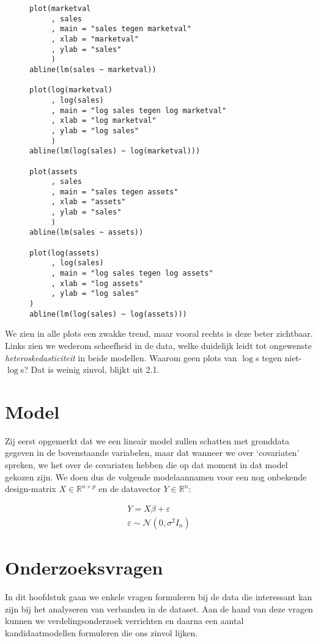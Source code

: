 \documentclass[a4paper, notitlepage]{report}
\begin{document}
\begin{figure}
\begin{verbatim}
plot(marketval
     , sales
     , main = "sales tegen marketval"
     , xlab = "marketval"
     , ylab = "sales"
     )
abline(lm(sales ~ marketval))

plot(log(marketval)
     , log(sales)
     , main = "log sales tegen log marketval"
     , xlab = "log marketval"
     , ylab = "log sales"
     )
abline(lm(log(sales) ~ log(marketval)))

plot(assets
     , sales
     , main = "sales tegen assets"
     , xlab = "assets"
     , ylab = "sales"
     )
abline(lm(sales ~ assets))

plot(log(assets)
     , log(sales)
     , main = "log sales tegen log assets"
     , xlab = "log assets"
     , ylab = "log sales"
)
abline(lm(log(sales) ~ log(assets)))
\end{verbatim}
\end{figure}
  
  We zien in alle plots een zwakke trend, maar vooral rechts is deze beter zichtbaar. Links zien we wederom scheefheid in de data, welke duidelijk leidt tot ongewenste \emph{heteroskedasticiteit} in beide modellen. Waarom geen plots van $\log$s tegen niet-$\log$s? Dat is weinig zinvol, blijkt uit 2.1. 

\section{Model}  
  Zij eerst opgemerkt dat we een lineair model zullen schatten met gronddata gegeven in de bovenstaande variabelen, maar dat wanneer we over `covariaten' spreken, we het over de covariaten hebben die op dat moment in dat model gekozen zijn. We doen dus de volgende modelaannamen voor een nog onbekende design-matrix $X \in \mathbb{R}^{n\times p}$ en de datavector $Y \in \mathbb{R}^n$:
  
\begin{align}
  Y = X\beta + \varepsilon \\
  \varepsilon \sim \mathcal{N}(0,\sigma^2I_n)
\end{align}
  
\section{Onderzoeksvragen}
  In dit hoofdstuk gaan we enkele vragen formuleren bij de data die interessant kan zijn bij het analyseren van verbanden in de dataset. Aan de hand van deze vragen kunnen we verdelingsonderzoek verrichten en daarna een aantal kandidaatmodellen formuleren die ons zinvol lijken.
  
\end{document}

